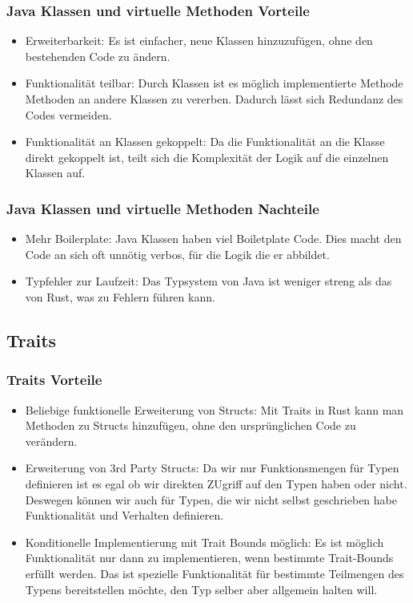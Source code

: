 \documentclass[a4paper, 1ppt]{article}
\begin{document}
\subsubsection{Java Klassen und virtuelle Methoden Vorteile}
\begin{itemize}
	\item Erweiterbarkeit: Es ist einfacher, neue Klassen hinzuzufügen, ohne den bestehenden Code zu ändern.
	\item Funktionalität teilbar: Durch Klassen ist es möglich implementierte Methode Methoden an andere Klassen zu vererben.
Dadurch lässt sich Redundanz des Codes vermeiden.
\item Funktionalität an Klassen gekoppelt: Da die Funktionalität an die Klasse direkt gekoppelt ist, teilt sich die Komplexität der Logik auf die einzelnen Klassen auf.
\end{itemize}
\subsubsection{Java Klassen und virtuelle Methoden Nachteile}
\begin{itemize}
	\item Mehr Boilerplate: Java Klassen haben viel Boiletplate Code. Dies macht den Code an sich oft unnötig verbos, für die Logik die er abbildet.
	\item Typfehler zur Laufzeit: Das Typsystem von Java ist weniger streng als das von Rust, was zu  Fehlern führen kann.
\end{itemize}
\subsection{Traits}
\subsubsection{Traits Vorteile}
\begin{itemize}
	\item Beliebige funktionelle Erweiterung von Structs: Mit Traits in Rust kann man Methoden zu  Structs hinzufügen, ohne den ursprünglichen Code zu verändern. 
	\item Erweiterung von 3rd Party Structs: Da wir nur Funktionsmengen für Typen definieren ist es egal ob wir direkten ZUgriff auf den Typen haben oder nicht. Deswegen können wir auch für Typen, die wir nicht selbst geschrieben habe Funktionalität und Verhalten definieren.
	\item Konditionelle Implementierung mit Trait Bounds möglich: Es ist möglich Funktionalität nur dann zu implementieren, wenn bestimmte Trait-Bounds erfüllt werden. Das ist spezielle Funktionalität für bestimmte Teilmengen des Typens bereitstellen möchte, den Typ selber aber allgemein halten will.
\end{itemize}
\end{document}

